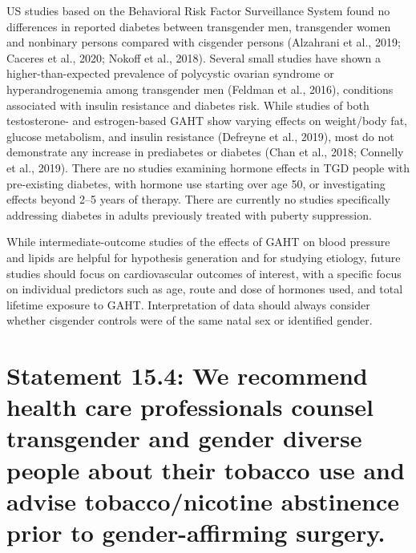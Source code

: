 \documentclass[
]{book}
\begin{document}
US studies based on the Behavioral Risk Factor
Surveillance System found no differences in
reported diabetes between transgender men,
transgender women and nonbinary persons compared with cisgender persons (Alzahrani et al.,
2019; Caceres et al., 2020; Nokoff et al., 2018).
Several small studies have shown a higher-than-expected prevalence of polycystic ovarian syndrome
or hyperandrogenemia among transgender men
(Feldman et al., 2016), conditions associated with
insulin resistance and diabetes risk. While studies
of both testosterone- and estrogen-based GAHT
show varying effects on weight/body fat, glucose
metabolism, and insulin resistance (Defreyne
et al., 2019), most do not demonstrate any
increase in prediabetes or diabetes (Chan et al.,
2018; Connelly et al., 2019). There are no studies
examining hormone effects in TGD people with
pre-existing diabetes, with hormone use starting
over age 50, or investigating effects beyond 2--5
years of therapy. There are currently no studies
specifically addressing diabetes in adults previously treated with puberty suppression.

While intermediate-outcome studies of the
effects of GAHT on blood pressure and lipids
are helpful for hypothesis generation and for
studying etiology, future studies should focus on
cardiovascular outcomes of interest, with a specific focus on individual predictors such as age,
route and dose of hormones used, and total lifetime exposure to GAHT. Interpretation of data
should always consider whether cisgender controls were of the same natal sex or identified gender.

\hypertarget{statement-15.4-we-recommend-health-care-professionals-counsel-transgender-and-gender-diverse-people-about-their-tobacco-use-and-advise-tobacconicotine-abstinence-prior-to-gender-affirming-surgery.}{%
\section*{Statement 15.4: We recommend health care professionals counsel transgender and gender diverse people about their tobacco use and advise tobacco/nicotine abstinence prior to gender-affirming surgery.}\label{statement-15.4-we-recommend-health-care-professionals-counsel-transgender-and-gender-diverse-people-about-their-tobacco-use-and-advise-tobacconicotine-abstinence-prior-to-gender-affirming-surgery.}}
\end{document}
